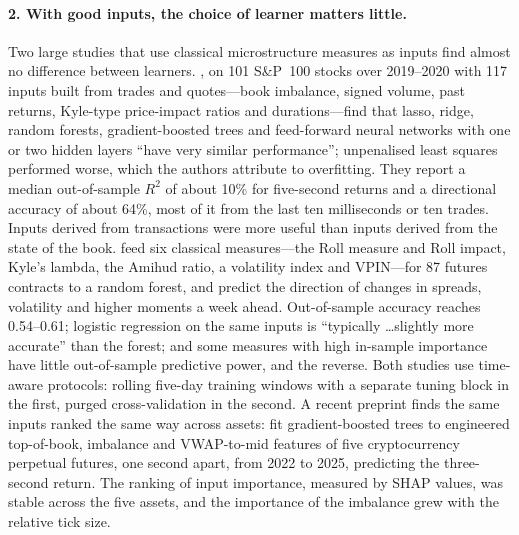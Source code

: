 \paragraph{2. With good inputs, the choice of learner matters little.} Two large studies that use
classical microstructure measures as inputs find almost no difference between learners.
\citet{aitsahalia2026}, on 101 S\&P~100 stocks over 2019--2020 with 117 inputs built from trades and
quotes---book imbalance, signed volume, past returns, Kyle-type price-impact ratios and durations---find
that lasso, ridge, random forests, gradient-boosted trees and feed-forward neural networks with one or two hidden layers ``have very similar
performance''; unpenalised least squares performed worse, which the authors attribute to overfitting. They report a median
out-of-sample $R^2$ of about 10\% for five-second returns and a directional accuracy of about 64\%, most of
it from the last ten milliseconds or ten trades. Inputs derived from transactions were more useful
than inputs derived from the state of the book. \citet{easley2021} feed six classical
measures---the Roll measure and Roll impact, Kyle's lambda, the Amihud ratio, a volatility index and
VPIN---for 87 futures contracts to a random forest, and predict the direction of changes in spreads,
volatility and higher moments a week ahead. Out-of-sample accuracy reaches 0.54--0.61; logistic regression
on the same inputs is ``typically \ldots slightly more accurate'' than the forest; and some measures with
high in-sample importance have little out-of-sample predictive power, and the reverse. Both studies use
time-aware protocols: rolling five-day training windows with a separate tuning block in the first, purged
cross-validation in the second. A recent preprint finds the same inputs ranked the same way across assets:
\citet{bieganowski2026} fit gradient-boosted trees to engineered top-of-book, imbalance and VWAP-to-mid
features of five cryptocurrency perpetual futures, one second apart, from 2022 to 2025, predicting the
three-second return. The ranking of input importance, measured by SHAP values, was stable across the five
assets, and the importance of the imbalance grew with the relative tick size.


